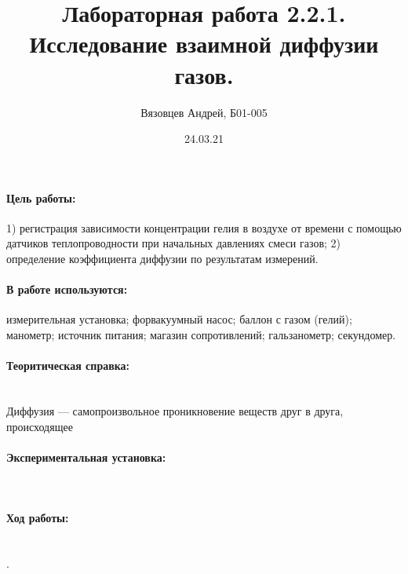 \documentclass[a4paper, 12pt]{article}
\author{Вязовцев Андрей, Б01-005}
\date{24.03.21}
\title{Лабораторная работа 2.2.1. Исследование взаимной диффузии газов.}
\newcommand{\parag}[1]{\paragraph*{#1:}}
\newcounter{Points}
\newcommand{\point}{\arabic{Points}. \addtocounter{Points}{1}}
\begin{document}
\maketitle

\parag {Цель работы}
1) регистрация зависимости концентрации гелия в воздухе от времени с помощью датчиков теплопроводности при начальных давлениях смеси газов; 2) определение коэффициента диффузии по результатам измерений.

\parag {В работе используются}
измерительная установка; форвакуумный насос; баллон с газом (гелий); манометр; источник питания; магазин сопротивлений; гальзанометр; секундомер.

\parag {Теоритическая справка} ~\\

Диффузия --- самопроизвольное проникновение веществ друг в друга, происходящее 

\parag {Экспериментальная установка} ~


\parag {Ход работы} ~\\

\point 
\end{document}
